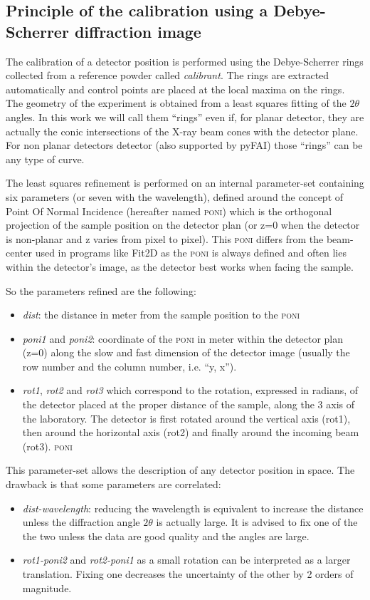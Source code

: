 \documentclass[preprint]{iucr}              %
\begin{document}
\subsection{Principle of the calibration using a Debye-Scherrer diffraction
image}
The calibration of a detector position is performed using the Debye-Scherrer
rings collected from a reference powder called \textit{calibrant}.
The rings are extracted automatically and control points are placed at the
local maxima on the rings.
The geometry of the experiment is obtained from a least squares fitting of
the $2\theta$ angles.
In this work we will call them ``rings'' even if, for planar detector,
they are actually the conic intersections of the X-ray beam cones
with the detector plane.
For non planar detectors detector (also supported by pyFAI) those ``rings'' can
be any type of curve.

The least squares refinement is performed on an internal parameter-set
containing six  parameters (or seven with the wavelength), defined around the
concept of Point Of Normal Incidence (hereafter named \textsc{poni}) which is
the orthogonal projection  of the sample position on the detector plan 
(or z=0 when the detector is non-planar and z varies from pixel to pixel).
This \textsc{poni} differs from the beam-center used in programs like
Fit2D \cite{fit2d} as the \textsc{poni} is always defined and often lies within
the detector's image, as the detector best works when facing the sample.

So the parameters refined are the following:
\begin{itemize}
  \item \textit{dist}: the distance in meter from the sample position to the
  \textsc{poni}
  \item \textit{poni1} and \textit{poni2}: coordinate of the
  \textsc{poni} in meter within the detector plan (z=0) along the slow and fast
  dimension of the detector image (usually the row number and the column
  number, i.e. ``y, x'').
  \item \textit{rot1}, \textit{rot2} and \textit{rot3} which correspond to the
  rotation, expressed in radians, of the detector placed at the proper
  distance of the sample, along the 3 axis of the laboratory. The detector is
  first rotated around the vertical axis (rot1), then around the horizontal axis
  (rot2) and finally around the incoming beam (rot3). 
  \textsc{poni}
\end{itemize}

This parameter-set allows the description of any detector position in space.
The drawback is that some parameters are correlated: 
\begin{itemize}
  \item \textit{dist-wavelength}: reducing the wavelength is equivalent to
  increase the distance unless the diffraction angle $2\theta$ is actually
  large. It is advised to fix one of the the two unless the data are good
  quality and the angles are large.
  \item \textit{rot1-poni2} and \textit{rot2-poni1} as a small rotation can be
  interpreted as a larger translation. Fixing one decreases the uncertainty of
  the other by 2 orders of magnitude.
\end{itemize}
\end{document}
